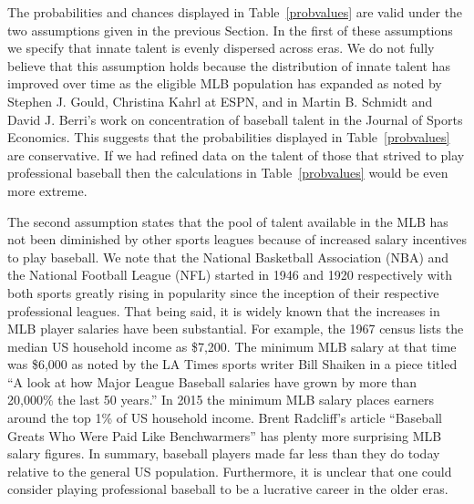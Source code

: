 \documentclass[11pt]{article}\usepackage[]{graphicx}\usepackage[]{color}
\begin{document}
The probabilities and chances displayed in Table~\ref{probvalues} are valid 
under the two assumptions given in the previous Section.  In the first of 
these assumptions we specify that innate talent is evenly dispersed across 
eras.  We do not fully believe that this assumption holds because the 
distribution of innate talent has improved over time as the eligible MLB 
population has expanded as noted by Stephen J. Gould,  
Christina Kahrl at ESPN, and in 
Martin B. Schmidt and David J. Berri's work on concentration of baseball 
talent in the Journal of Sports Economics.
This suggests that the probabilities displayed in Table~\ref{probvalues} are 
conservative.  If we had refined data on the talent of those that strived 
to play professional baseball then the calculations in Table~\ref{probvalues} 
would be even more extreme.

The second assumption states that the pool of 
talent available in the MLB has not been diminished by other sports leagues 
because of increased salary incentives to play baseball.  We note that the 
National Basketball Association (NBA) and the National Football League (NFL) 
started in 1946 and 1920 respectively %
with both sports greatly rising in popularity since the inception of their 
respective professional leagues.  That being said, it is widely known that 
the increases in MLB player salaries have been substantial.  
For example, the 1967 census lists the median US household income as \$7,200. 
The minimum MLB salary at that time was \$6,000 as noted by the LA Times 
sports writer Bill Shaiken in a piece titled ``A look at how Major League 
Baseball salaries have grown by more than 20,000\% the last 50 years.''
In 2015 the minimum MLB salary places earners around the top 1\% of 
US household income.
Brent Radcliff's article ``Baseball Greats Who Were Paid Like Benchwarmers''
has plenty more surprising MLB salary figures.
In summary, baseball players made far less than they do today relative to the 
general US population.  Furthermore, it is unclear that one could consider 
playing professional baseball to be a lucrative career in the older eras. 
\end{document}
